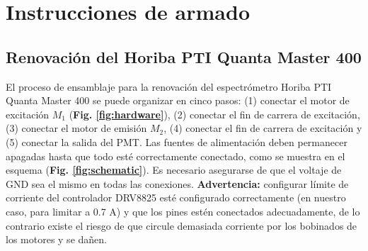 
\renewcommand{\thesection}{\Alph{section}}
\renewcommand{\thefigure}{A\arabic{figure}}
\renewcommand{\tablename}{Tabla}
\renewcommand{\thetable}{A\arabic{table}}

\section{Instrucciones de armado} \label{apendice:instrucciones_armado}

\subsection{Renovación del Horiba PTI Quanta Master 400} \label{subsec:refur-instructions}

El proceso de ensamblaje para la renovación del espectrómetro Horiba PTI Quanta Master 400 se puede organizar en cinco pasos: (1) conectar el motor de excitación $M_1$ (\textbf{Fig. \ref{fig:hardware}}), (2) conectar el fin de carrera de excitación, (3) conectar el motor de emisión $M_2$, (4) conectar el fin de carrera de excitación y (5) conectar la salida del PMT. 
Las fuentes de alimentación deben permanecer apagadas hasta que todo esté correctamente conectado, como se muestra en el esquema (\textbf{Fig. \ref{fig:schematic}}). 
Es necesario asegurarse de que el voltaje de GND sea el mismo en todas las conexiones. 
\textbf{Advertencia:} configurar límite de corriente del controlador DRV8825 esté configurado correctamente (en nuestro caso, para limitar a 0.7 A) y que los pines estén conectados adecuadamente, de lo contrario existe el riesgo de que circule demasiada corriente por los bobinados de los motores y se dañen.

